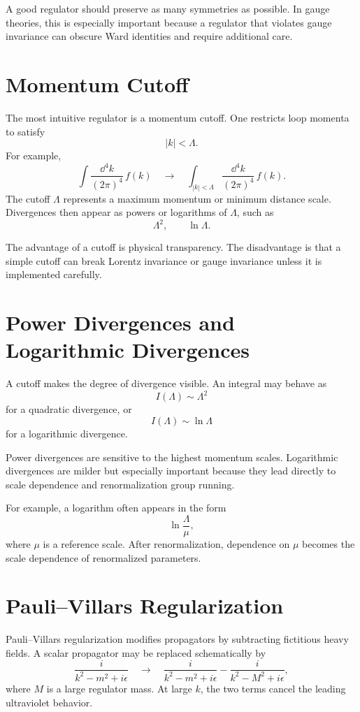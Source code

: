 A good regulator should preserve as many symmetries as possible. In gauge
theories, this is especially important because a regulator that violates gauge
invariance can obscure Ward identities and require additional care.

\section{Momentum Cutoff}

The most intuitive regulator is a momentum cutoff. One restricts loop momenta to
satisfy
\[
    |k|<\Lambda.
\]
For example,
\[
    \int\frac{\dd^4k}{(2\pi)^4}\,f(k)
    \quad\longrightarrow\quad
    \int_{|k|<\Lambda}\frac{\dd^4k}{(2\pi)^4}\,f(k).
\]
The cutoff \(\Lambda\) represents a maximum momentum or minimum distance scale.
Divergences then appear as powers or logarithms of \(\Lambda\), such as
\[
    \Lambda^2,
    \qquad
    \ln\Lambda.
\]

The advantage of a cutoff is physical transparency. The disadvantage is that a
simple cutoff can break Lorentz invariance or gauge invariance unless it is
implemented carefully.

\section{Power Divergences and Logarithmic Divergences}

A cutoff makes the degree of divergence visible. An integral may behave as
\[
    I(\Lambda)\sim \Lambda^2
\]
for a quadratic divergence, or
\[
    I(\Lambda)\sim \ln\Lambda
\]
for a logarithmic divergence.

Power divergences are sensitive to the highest momentum scales. Logarithmic
divergences are milder but especially important because they lead directly to
scale dependence and renormalization group running.

For example, a logarithm often appears in the form
\[
    \ln\frac{\Lambda}{\mu},
\]
where \(\mu\) is a reference scale. After renormalization, dependence on \(\mu\)
becomes the scale dependence of renormalized parameters.

\section{Pauli--Villars Regularization}

Pauli--Villars regularization modifies propagators by subtracting fictitious
heavy fields. A scalar propagator may be replaced schematically by
\[
    \frac{i}{k^2-m^2+i\epsilon}
    \quad\longrightarrow\quad
    \frac{i}{k^2-m^2+i\epsilon}
    -\frac{i}{k^2-M^2+i\epsilon},
\]
where \(M\) is a large regulator mass. At large \(k\), the two terms cancel the
leading ultraviolet behavior.

